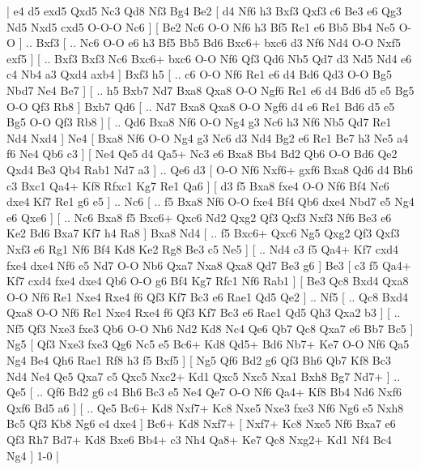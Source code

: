\makegametitle 
|   e4   d5    exd5   Qxd5    Nc3   Qd8    Nf3   Bg4    Be2 [  d4 Nf6  h3 Bxf3  Qxf3 c6  Be3 e6  Qg3 Nd5  Nxd5 cxd5  O-O-O Nc6   ]  [  Be2 Nc6  O-O Nf6  h3 Bf5  Re1 e6  Bb5 Bb4  Ne5 O-O   ] .. Bxf3 [ .. Nc6  O-O e6  h3 Bf5  Bb5 Bd6  Bxc6+ bxc6  d3 Nf6  Nd4 O-O  Nxf5 exf5   ]  [ .. Bxf3  Bxf3 Nc6  Bxc6+ bxc6  O-O Nf6  Qf3 Qd6  Nb5 Qd7  d3 Nd5  Nd4 e6  c4 Nb4  a3 Qxd4  axb4   ]  Bxf3   h5 [ .. c6  O-O Nf6  Re1 e6  d4 Bd6  Qd3 O-O  Bg5 Nbd7  Ne4 Be7   ]  [ .. h5  Bxb7 Nd7  Bxa8 Qxa8  O-O Ngf6  Re1 e6  d4 Bd6  d5 e5  Bg5 O-O  Qf3 Rb8   ]  Bxb7   Qd6 [ .. Nd7  Bxa8 Qxa8  O-O Ngf6  d4 e6  Re1 Bd6  d5 e5  Bg5 O-O  Qf3 Rb8   ]  [ .. Qd6  Bxa8 Nf6  O-O Ng4  g3 Nc6  h3 Nf6  Nb5 Qd7  Re1 Nd4  Nxd4   ]  Ne4 [  Bxa8 Nf6  O-O Ng4  g3 Nc6  d3 Nd4  Bg2 e6  Re1 Be7  h3 Ne5  a4 f6  Ne4 Qb6  c3   ]  [  Ne4 Qe5  d4 Qa5+  Nc3 e6  Bxa8 Bb4  Bd2 Qb6  O-O Bd6  Qe2 Qxd4  Be3 Qb4  Rab1 Nd7  a3   ] .. Qe6    d3 [  O-O Nf6  Nxf6+ gxf6  Bxa8 Qd6  d4 Bh6  c3 Bxc1  Qa4+ Kf8  Rfxc1 Kg7  Re1 Qa6   ]  [  d3 f5  Bxa8 fxe4  O-O Nf6  Bf4 Nc6  dxe4 Kf7  Re1 g6  e5   ] .. Nc6 [ .. f5  Bxa8 Nf6  O-O fxe4  Bf4 Qb6  dxe4 Nbd7  e5 Ng4  e6 Qxe6   ]  [ .. Nc6  Bxa8 f5  Bxc6+ Qxc6  Nd2 Qxg2  Qf3 Qxf3  Nxf3 Nf6  Be3 e6  Ke2 Bd6  Bxa7 Kf7  h4 Ra8   ]  Bxa8   Nd4 [ .. f5  Bxc6+ Qxc6  Ng5 Qxg2  Qf3 Qxf3  Nxf3 e6  Rg1 Nf6  Bf4 Kd8  Ke2 Rg8  Be3 c5  Ne5   ]  [ .. Nd4  c3 f5  Qa4+ Kf7  cxd4 fxe4  dxe4 Nf6  e5 Nd7  O-O Nb6  Qxa7 Nxa8  Qxa8 Qd7  Be3 g6   ]  Be3 [  c3 f5  Qa4+ Kf7  cxd4 fxe4  dxe4 Qb6  O-O g6  Bf4 Kg7  Rfc1 Nf6  Rab1   ]  [  Be3 Qc8  Bxd4 Qxa8  O-O Nf6  Re1 Nxe4  Rxe4 f6  Qf3 Kf7  Bc3 e6  Rae1 Qd5  Qe2   ] .. Nf5 [ .. Qc8  Bxd4 Qxa8  O-O Nf6  Re1 Nxe4  Rxe4 f6  Qf3 Kf7  Bc3 e6  Rae1 Qd5  Qh3 Qxa2  b3   ]  [ .. Nf5  Qf3 Nxe3  fxe3 Qb6  O-O Nh6  Nd2 Kd8  Nc4 Qe6  Qb7 Qc8  Qxa7 e6  Bb7 Bc5   ]  Ng5 [  Qf3 Nxe3  fxe3 Qg6  Nc5 e5  Bc6+ Kd8  Qd5+ Bd6  Nb7+ Ke7  O-O Nf6  Qa5 Ng4  Be4 Qh6  Rae1 Rf8  h3 f5  Bxf5   ]  [  Ng5 Qf6  Bd2 g6  Qf3 Bh6  Qb7 Kf8  Bc3 Nd4  Ne4 Qe5  Qxa7 c5  Qxc5 Nxc2+  Kd1 Qxc5  Nxc5 Nxa1  Bxh8 Bg7  Nd7+   ] .. Qe5 [ .. Qf6  Bd2 g6  c4 Bh6  Bc3 e5  Ne4 Qe7  O-O Nf6  Qa4+ Kf8  Bb4 Nd6  Nxf6 Qxf6  Bd5 a6   ]  [ .. Qe5  Bc6+ Kd8  Nxf7+ Kc8  Nxe5 Nxe3  fxe3 Nf6  Ng6 e5  Nxh8 Bc5  Qf3 Kb8  Ng6 e4  dxe4   ]  Bc6+   Kd8   Nxf7+    [  Nxf7+ Kc8  Nxe5 Nf6  Bxa7 e6  Qf3 Rh7  Bd7+ Kd8  Bxe6 Bb4+  c3 Nh4  Qa8+ Ke7  Qc8 Nxg2+  Kd1 Nf4  Bc4 Ng4   ] 1-0  |
